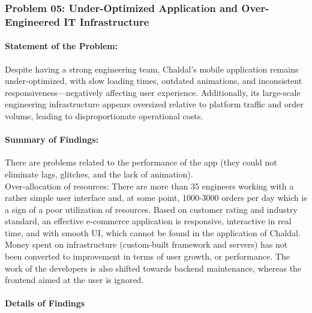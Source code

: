 \documentclass[12pt,a4paper]{article}
\begin{document}
\subsubsection{Problem 05: Under-Optimized Application and Over-Engineered IT Infrastructure}

\paragraph{Statement of the Problem:}
Despite having a strong engineering team, Chaldal’s mobile application remains under-optimized, with slow loading times, outdated animations, and inconsistent responsiveness—negatively affecting user experience. Additionally, its large-scale engineering infrastructure appears oversized relative to platform traffic and order volume, leading to disproportionate operational costs.

\paragraph{Summary of Findings:}

There are problems related to the performance of the app (they could not eliminate lags, glitches, and the lack of animation).\\
Over-allocation of resources: There are more than 35 engineers working with a rather simple user interface and, at some point, 1000-3000 orders per day which is a sign of a poor utilization of resources.
Based on customer rating and industry standard, an effective e-commerce application is responsive, interactive in real time, and with smooth UI, which cannot be found in the application of Chaldal.
Money spent on infrastructure (custom-built framework and servers) has not been converted to improvement in terms of user growth, or performance.
The work of the developers is also shifted towards backend maintenance, whereas the frontend aimed at the user is ignored.\\


\paragraph{Details of Findings}
\end{document}
